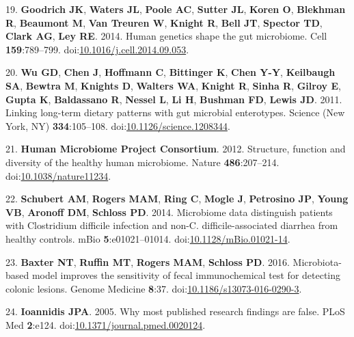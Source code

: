 \documentclass[12pt,]{article}
\begin{document}
\hypertarget{ref-goodrichux5fhumanux5f2014}{}
19. \textbf{Goodrich JK}, \textbf{Waters JL}, \textbf{Poole AC},
\textbf{Sutter JL}, \textbf{Koren O}, \textbf{Blekhman R},
\textbf{Beaumont M}, \textbf{Van Treuren W}, \textbf{Knight R},
\textbf{Bell JT}, \textbf{Spector TD}, \textbf{Clark AG}, \textbf{Ley
RE}. 2014. Human genetics shape the gut microbiome. Cell
\textbf{159}:789--799.
doi:\href{https://doi.org/10.1016/j.cell.2014.09.053}{10.1016/j.cell.2014.09.053}.

\hypertarget{ref-wuux5flinkingux5f2011}{}
20. \textbf{Wu GD}, \textbf{Chen J}, \textbf{Hoffmann C},
\textbf{Bittinger K}, \textbf{Chen Y-Y}, \textbf{Keilbaugh SA},
\textbf{Bewtra M}, \textbf{Knights D}, \textbf{Walters WA},
\textbf{Knight R}, \textbf{Sinha R}, \textbf{Gilroy E}, \textbf{Gupta
K}, \textbf{Baldassano R}, \textbf{Nessel L}, \textbf{Li H},
\textbf{Bushman FD}, \textbf{Lewis JD}. 2011. Linking long-term dietary
patterns with gut microbial enterotypes. Science (New York, NY)
\textbf{334}:105--108.
doi:\href{https://doi.org/10.1126/science.1208344}{10.1126/science.1208344}.

\hypertarget{ref-humanux5fmicrobiomeux5fprojectux5fconsortiumux5fstructureux5f2012}{}
21. \textbf{Human Microbiome Project Consortium}. 2012. Structure,
function and diversity of the healthy human microbiome. Nature
\textbf{486}:207--214.
doi:\href{https://doi.org/10.1038/nature11234}{10.1038/nature11234}.

\hypertarget{ref-schubertux5fmicrobiomeux5f2014}{}
22. \textbf{Schubert AM}, \textbf{Rogers MAM}, \textbf{Ring C},
\textbf{Mogle J}, \textbf{Petrosino JP}, \textbf{Young VB},
\textbf{Aronoff DM}, \textbf{Schloss PD}. 2014. Microbiome data
distinguish patients with Clostridium difficile infection and non-C.
difficile-associated diarrhea from healthy controls. mBio
\textbf{5}:e01021--01014.
doi:\href{https://doi.org/10.1128/mBio.01021-14}{10.1128/mBio.01021-14}.

\hypertarget{ref-baxterux5fmicrobiota-basedux5f2016}{}
23. \textbf{Baxter NT}, \textbf{Ruffin MT}, \textbf{Rogers MAM},
\textbf{Schloss PD}. 2016. Microbiota-based model improves the
sensitivity of fecal immunochemical test for detecting colonic lesions.
Genome Medicine \textbf{8}:37.
doi:\href{https://doi.org/10.1186/s13073-016-0290-3}{10.1186/s13073-016-0290-3}.

\hypertarget{ref-Ioannidis2005}{}
24. \textbf{Ioannidis JPA}. 2005. Why most published research findings
are false. PLoS Med \textbf{2}:e124.
doi:\href{https://doi.org/10.1371/journal.pmed.0020124}{10.1371/journal.pmed.0020124}.
\end{document}
